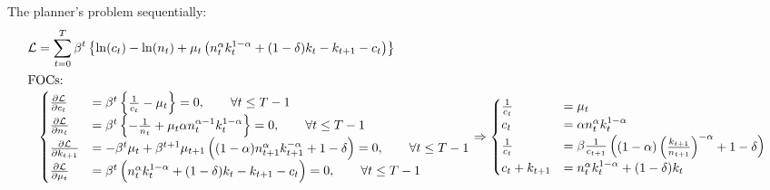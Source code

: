 \documentclass[]{article}
\begin{document}
\subsubsection{}
The planner's problem sequentially:
\begin{equation}
	\begin{split}
		\mathcal{L}& = \sum\limits_{t = 0}^T\beta^t\begin{Bmatrix}\ln(c_t) - \ln(n_t) + \mu_t\begin{pmatrix}n_t^\alpha k_t^{1 - \alpha} + (1 - \delta)k_t - k_{t+1} - c_t\end{pmatrix}\end{Bmatrix} \nonumber \\
		\intertext{FOCs:}
		&\begin{cases}
			\frac{\partial\mathcal{L}}{\partial c_t}& = \beta^t\begin{Bmatrix}\frac{1}{c_t} - \mu_t\end{Bmatrix} = 0, \qquad
			\forall t\leq T - 1 \\
			\frac{\partial\mathcal{L}}{\partial n_t}& = \beta^t\begin{Bmatrix}-\frac{1}{n_t} + \mu_t\alpha n_t^{\alpha - 1}k_t^{1 - \alpha}\end{Bmatrix} = 0, \qquad\forall t\leq T - 1 \\
			\frac{\partial\mathcal{L}}{\partial k_{t+1}}& = -\beta^t\mu_t + \beta^{t+1}\mu_{t+1}\begin{pmatrix}(1 - \alpha)n_{t+1}^\alpha k_{t+1}^{ - \alpha} + 1 - \delta\end{pmatrix} = 0, \qquad\forall t\leq T - 1 \\
			\frac{\partial\mathcal{L}}{\partial \mu_t}& = \beta^t\begin{pmatrix}n_t^\alpha k_t^{1 - \alpha} + (1 - \delta)k_t - k_{t+1} - c_t\end{pmatrix} = 0, \qquad\forall t\leq T-1
		\end{cases} \Rightarrow 
		\begin{cases}
			\frac{1}{c_t}& = \mu_t \\
			c_t& =  \alpha n_t^\alpha k_t^{1 - \alpha} \\
			\frac{1}{c_t}& = \beta\frac{1}{c_{t+1}}\begin{pmatrix}(1 - \alpha) \begin{pmatrix}\frac{k_{t+1}}{n_{t+1}}\end{pmatrix}^{-\alpha} + 1 - \delta\end{pmatrix} \\
			c_t + k_{t+1}& = n_t^\alpha k_t^{1 - \alpha} + (1 - \delta)k_t

\end{cases}
\end{split}
\end{equation}
\end{document}
